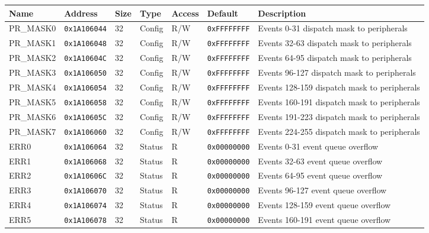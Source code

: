 \begin{table}[htbp]
  \small
\begin{tabularx}{\textwidth}{|l|l|l|l|l|l|X|}
  \hline
  \textbf{Name} & \textbf{Address}  & \textbf{Size} & \textbf{Type} & \textbf{Access} & \textbf{Default} & \textbf{Description} \\
  \hline
  PR\_MASK0 & \texttt{0x1A106044} & 32 & Config & R/W    & \texttt{0xFFFFFFFF} & Events 0-31 dispatch mask to peripherals \\
  \hline
  PR\_MASK1 & \texttt{0x1A106048} & 32 & Config & R/W    & \texttt{0xFFFFFFFF} & Events 32-63 dispatch mask to peripherals \\
  \hline
  PR\_MASK2 & \texttt{0x1A10604C} & 32 & Config & R/W    & \texttt{0xFFFFFFFF} & Events 64-95 dispatch mask to peripherals \\
  \hline
  PR\_MASK3 & \texttt{0x1A106050} & 32 & Config & R/W    & \texttt{0xFFFFFFFF} & Events 96-127 dispatch mask to peripherals \\
  \hline
  PR\_MASK4 & \texttt{0x1A106054} & 32 & Config & R/W    & \texttt{0xFFFFFFFF} & Events 128-159 dispatch mask to peripherals \\
  \hline
  PR\_MASK5 & \texttt{0x1A106058} & 32 & Config & R/W    & \texttt{0xFFFFFFFF} & Events 160-191 dispatch mask to peripherals \\
  \hline
  PR\_MASK6 & \texttt{0x1A10605C} & 32 & Config & R/W    & \texttt{0xFFFFFFFF} & Events 191-223 dispatch mask to peripherals \\
  \hline
  PR\_MASK7 & \texttt{0x1A106060} & 32 & Config & R/W    & \texttt{0xFFFFFFFF} & Events 224-255 dispatch mask to peripherals \\
  \hline
  ERR0 & \texttt{0x1A106064} & 32 & Status & R    & \texttt{0x00000000} & Events 0-31 event queue overflow \\
  \hline
  ERR1 & \texttt{0x1A106068} & 32 & Status & R    & \texttt{0x00000000} & Events 32-63 event queue overflow \\
  \hline
  ERR2 & \texttt{0x1A10606C} & 32 & Status & R    & \texttt{0x00000000} & Events 64-95 event queue overflow \\
  \hline
  ERR3 & \texttt{0x1A106070} & 32 & Status & R    & \texttt{0x00000000} & Events 96-127 event queue overflow \\
  \hline
  ERR4 & \texttt{0x1A106074} & 32 & Status & R    & \texttt{0x00000000} & Events 128-159 event queue overflow \\
  \hline
  ERR5 & \texttt{0x1A106078} & 32 & Status & R    & \texttt{0x00000000} & Events 160-191 event queue overflow \\

\end{tabularx}
\end{table}
